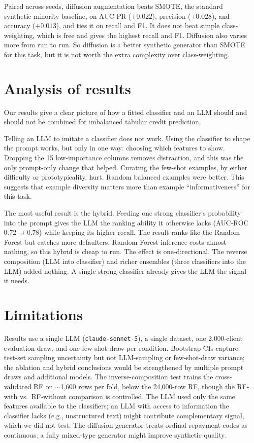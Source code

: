 \documentclass[conference]{IEEEtran}
\begin{document}
Paired across seeds, diffusion augmentation beats SMOTE, the standard synthetic-minority baseline, on AUC-PR ($+0.022$), precision ($+0.028$), and accuracy ($+0.013$), and ties it on recall and F1. It does not beat simple class-weighting, which is free and gives the highest recall and F1. Diffusion also varies more from run to run. So diffusion is a better synthetic generator than SMOTE for this task, but it is not worth the extra complexity over class-weighting.

\section{Analysis of results}
Our results give a clear picture of how a fitted classifier and an LLM should and should not be combined for imbalanced tabular credit prediction.

Telling an LLM to imitate a classifier does not work. Using the classifier to shape the prompt works, but only in one way: choosing which features to show. Dropping the 15 low-importance columns removes distraction, and this was the only prompt-only change that helped. Curating the few-shot examples, by either difficulty or prototypicality, hurt. Random balanced examples were better. This suggests that example diversity matters more than example ``informativeness'' for this task.

The most useful result is the hybrid. Feeding one strong classifier's probability into the prompt gives the LLM the ranking ability it otherwise lacks (AUC-ROC $0.72\to0.78$) while keeping its higher recall. The result ranks like the Random Forest but catches more defaulters. Random Forest inference costs almost nothing, so this hybrid is cheap to run. The effect is one-directional. The reverse composition (LLM into classifier) and richer ensembles (three classifiers into the LLM) added nothing. A single strong classifier already gives the LLM the signal it needs.

\section{Limitations}
Results use a single LLM (\texttt{claude-sonnet-5}), a single dataset, one 2{,}000-client evaluation draw, and one few-shot draw per condition. Bootstrap CIs capture test-set sampling uncertainty but not LLM-sampling or few-shot-draw variance; the ablation and hybrid conclusions would be strengthened by multiple prompt draws and additional models. The inverse-composition test trains the cross-validated RF on $\sim$1{,}600 rows per fold, below the 24{,}000-row RF, though the RF-with vs.\ RF-without comparison is controlled. The LLM used only the same features available to the classifiers; an LLM with access to information the classifier lacks (e.g., unstructured text) might contribute complementary signal, which we did not test. The diffusion generator treats ordinal repayment codes as continuous; a fully mixed-type generator might improve synthetic quality.
\end{document}

